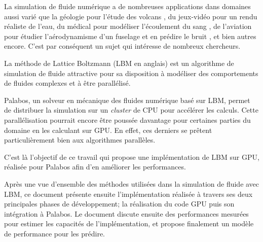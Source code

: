 La simulation de fluide numérique a de nombreuses applications dans domaines aussi varié que la géologie pour l'étude des volcans \cite{brogi_lattice_2017}, du jeux-vidéo pour un rendu réaliste de l'eau, du médical pour modéliser l'écoulement du sang \cite{hirabayashi_lattice_2004}, de l'aviation pour étudier l'aérodynamisme d'un fuselage et en prédire le bruit \cite{lew_noise_2010}, et bien autres encore. C'est par conséquent un sujet qui intéresse de nombreux chercheurs.

La méthode de Lattice Boltzmann (\acf{LBM} en anglais) est un algorithme de simulation de fluide attractive pour sa disposition à modéliser des comportements de fluides complexes et à être parallélisé.

Palabos, un solveur en mécanique des fluides numérique basé sur \acs{LBM}, permet de distribuer la simulation sur un \textit{cluster} de \acs{CPU} pour accélérer les calculs. Cette parallélisation pourrait encore être poussée  davantage pour certaines parties du domaine en les calculant sur \acs{GPU}. En effet, ces derniers se prêtent particulièrement bien aux algorithmes parallèles.

C'est là l'objectif de ce travail qui propose une implémentation de \acs{LBM} sur \acs{GPU}, réalisée pour Palabos afin d'en améliorer les performances.

Après une vue d'ensemble des méthodes utilisées dans la simulation de fluide avec \acs{LBM}, ce document présente ensuite l'implémentation réalisée à travers ses deux principales phases de développement; la réalisation du code \acs{GPU} puis son intégration à Palabos.
Le document discute ensuite des performances mesurées pour estimer les capacités de l'implémentation, et propose finalement un modèle de performance pour les prédire.
